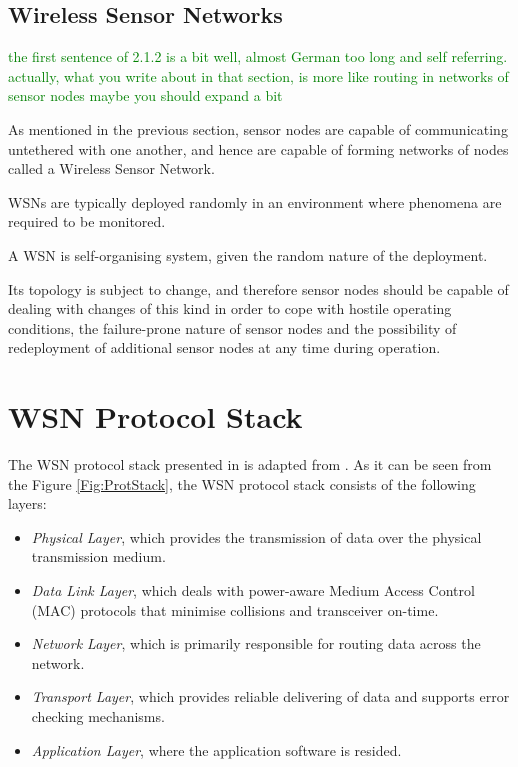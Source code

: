 \subsection{Wireless Sensor Networks}
\textcolor{green}{the first sentence of 2.1.2 is a bit well, almost German
too long and self referring. actually, what you write about in that section, is more like routing in networks of sensor nodes
maybe you should expand a bit}

As mentioned in the previous section, sensor nodes are capable of communicating
untethered with one another, and hence are capable of forming networks of nodes
called a Wireless Sensor Network. 

WSNs are typically deployed randomly in an
environment where phenomena are required to be monitored. 

A WSN is self-organising system, given the random nature of the deployment.

Its topology is subject to change, and therefore sensor nodes should be
capable of dealing with changes of this kind in order to cope with hostile
operating conditions, the failure-prone nature of sensor nodes and the possibility of 
redeployment of additional sensor nodes at any time during operation.


\section{WSN Protocol Stack} \label{sec:WSNProtStack}

The WSN protocol stack presented in \cite{SensorSurveyAkyildiz:2002} is adapted
from \cite{ComputerNetworksTannenbaum:2003}. As it can be seen from the
Figure \ref{Fig:ProtStack}, the WSN protocol stack consists of the following layers:

\begin{itemize}
\item \emph{Physical Layer}, which provides the transmission of data over the physical transmission medium.
\item \emph{Data Link Layer}, which deals with power-aware Medium Access Control (MAC) protocols that minimise collisions and transceiver on-time.
\item \emph{Network Layer}, which is primarily responsible for
routing data across the network.
\item \emph{Transport Layer}, which provides reliable delivering of data and
supports error checking mechanisms.
\item \emph{Application Layer}, where the application software is resided.
\end{itemize}

